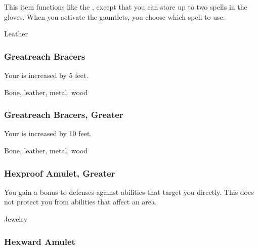 This item functions like the , except that you can store up to two spells in the gloves.
When you activate the gauntlets, you choose which spell to use.



 


 Leather


\lowercase{\hypertarget{item:Greatreach Bracers}{}}\label{item:Greatreach Bracers}
\hypertarget{item:Greatreach Bracers}{\subsubsection{Greatreach Bracers\hfill{}}}

Your  is increased by 5 feet.



 Bone, leather, metal, wood


\lowercase{\hypertarget{item:Greatreach Bracers, Greater}{}}\label{item:Greatreach Bracers, Greater}
\hypertarget{item:Greatreach Bracers, Greater}{\subsubsection{Greatreach Bracers, Greater\hfill{}}}

Your  is increased by 10 feet.



 Bone, leather, metal, wood


\lowercase{\hypertarget{item:Hexproof Amulet, Greater}{}}\label{item:Hexproof Amulet, Greater}
\hypertarget{item:Hexproof Amulet, Greater}{\subsubsection{Hexproof Amulet, Greater\hfill{}}}

You gain a  bonus to defenses against  abilities that target you directly.
This does not protect you from abilities that affect an area.



 


 Jewelry


\lowercase{\hypertarget{item:Hexward Amulet}{}}\label{item:Hexward Amulet}
\hypertarget{item:Hexward Amulet}{\subsubsection{Hexward Amulet\hfill{}}}

